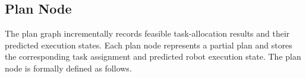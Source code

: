 \documentclass[lettersize,journal]{IEEEtran}
\theoremstyle{italiclemma}
\theoremstyle{italiclemma}
\theoremstyle{definition}
\begin{document}


\subsection{Plan Node}
The plan graph incrementally records feasible task-allocation results and their predicted execution states. Each plan node represents a partial plan and stores the corresponding task assignment and predicted robot execution state. The plan node is formally defined as follows.
\end{document}
